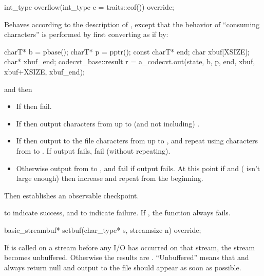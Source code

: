 %
\begin{itemdecl}
int_type overflow(int_type c = traits::eof()) override;
\end{itemdecl}

\begin{itemdescr}
\pnum
\effects
Behaves according to the description of
,
except that the behavior of ``consuming characters'' is performed by first
converting as if by:
\begin{codeblock}
charT*       b = pbase();
charT*       p = pptr();
const charT* end;
char         xbuf[XSIZE];
char*        xbuf_end;
codecvt_base::result r =
  a_codecvt.out(state, b, p, end, xbuf, xbuf+XSIZE, xbuf_end);
\end{codeblock}
and then
\begin{itemize}
\item If  then fail.
\item If  then output characters from
 up to (and not including) .
\item If  then output to the file characters from
 up to , and repeat using characters from
 to . If output fails, fail (without repeating).
\item Otherwise output from  to , and fail if output fails.
At this point if  and  ( isn't large
enough) then increase  and repeat from the beginning.
\end{itemize}
Then establishes an observable checkpoint.

\pnum
\returns
{}
to indicate success, and
to indicate failure.
If
,
the function always fails.
\end{itemdescr}

%
\begin{itemdecl}
basic_streambuf* setbuf(char_type* s, streamsize n) override;
\end{itemdecl}

\begin{itemdescr}
\pnum
\effects
If
is called on a stream before any I/O has occurred on that stream, the
stream becomes unbuffered.
Otherwise the results are .
``Unbuffered'' means that
and
always return null
and output to the file should appear as soon as possible.
\end{itemdescr}

